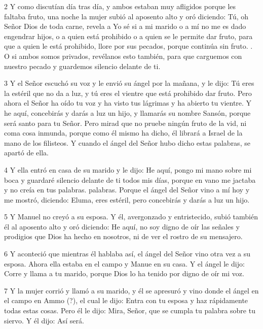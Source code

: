 \par 2 Y como discutían día tras día, y ambos estaban muy afligidos porque les faltaba fruto, una noche la mujer subió al aposento alto y oró diciendo: Tú, oh Señor Dios de toda carne, revela a Yo sé si a mi marido o a mí no me es dado engendrar hijos, o a quien está prohibido o a quien se le permite dar fruto, para que a quien le está prohibido, llore por sus pecados, porque continúa sin fruto. . O si ambos somos privados, revélanos esto también, para que carguemos con nuestro pecado y guardemos silencio delante de ti.

\par 3 Y el Señor escuchó su voz y le envió su ángel por la mañana, y le dijo: Tú eres la estéril que no da a luz, y tú eres el vientre que está prohibido dar fruto. Pero ahora el Señor ha oído tu voz y ha visto tus lágrimas y ha abierto tu vientre. Y he aquí, concebirás y darás a luz un hijo, y llamarás su nombre Sansón, porque será santo para tu Señor. Pero mirad que no pruebe ningún fruto de la vid, ni coma cosa inmunda, porque como él mismo ha dicho, él librará a Israel de la mano de los filisteos. Y cuando el ángel del Señor hubo dicho estas palabras, se apartó de ella.

\par 4 Y ella entró en casa de su marido y le dijo: He aquí, pongo mi mano sobre mi boca y guardaré silencio delante de ti todos mis días, porque en vano me jactaba y no creía en tus palabras. palabras. Porque el ángel del Señor vino a mí hoy y me mostró, diciendo: Eluma, eres estéril, pero concebirás y darás a luz un hijo.

\par 5 Y Manuel no creyó a su esposa. Y él, avergonzado y entristecido, subió también él al aposento alto y oró diciendo: He aquí, no soy digno de oír las señales y prodigios que Dios ha hecho en nosotros, ni de ver el rostro de su mensajero.

\par 6 Y aconteció que mientras él hablaba así, el ángel del Señor vino otra vez a su esposa. Ahora ella estaba en el campo y Manue en su casa. Y el ángel le dijo: Corre y llama a tu marido, porque Dios lo ha tenido por digno de oír mi voz.

\par 7 Y la mujer corrió y llamó a su marido, y él se apresuró y vino donde el ángel en el campo en Ammo (?), el cual le dijo: Entra con tu esposa y haz rápidamente todas estas cosas. Pero él le dijo: Mira, Señor, que se cumpla tu palabra sobre tu siervo. Y él dijo: Así será.

